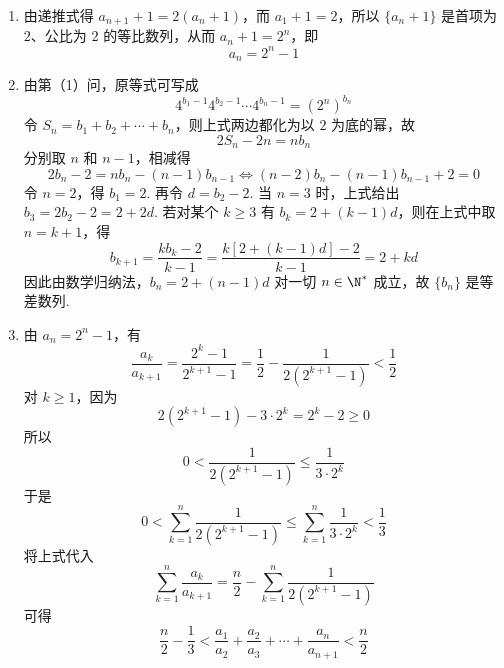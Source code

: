 \begin{solution}
\begin{enumerate}
\item 由递推式得 \(a_{n+1}+1=2(a_n+1)\)，而 \(a_1+1=2\)，所以 \(\{a_n+1\}\) 是首项为 \(2\)、公比为 \(2\) 的等比数列，从而 \(a_n+1=2^n\)，即
\[
a_n=2^n-1
\]
\item 由第（1）问，原等式可写成
\[
4^{b_1-1}4^{b_2-1}\cdots4^{b_n-1}=(2^n)^{b_n}
\]
令 \(S_n=b_1+b_2+\cdots+b_n\)，则上式两边都化为以 \(2\) 为底的幂，故
\[
2S_n-2n=nb_n
\]
分别取 \(n\) 和 \(n-1\)，相减得
\[
2b_n-2=nb_n-(n-1)b_{n-1}
\Longleftrightarrow
(n-2)b_n-(n-1)b_{n-1}+2=0
\]
令 \(n=2\)，得 \(b_1=2\). 再令 \(d=b_2-2\). 当 \(n=3\) 时，上式给出 \(b_3=2b_2-2=2+2d\). 若对某个 \(k\geqslant3\) 有 \(b_k=2+(k-1)d\)，则在上式中取 \(n=k+1\)，得
\[
b_{k+1}=\frac{kb_k-2}{k-1}=\frac{k\left[2+(k-1)d\right]-2}{k-1}=2+kd
\]
因此由数学归纳法，\(b_n=2+(n-1)d\) 对一切 \(n\in\N^*\) 成立，故 \(\{b_n\}\) 是等差数列.
\item 由 \(a_n=2^n-1\)，有
\[
\frac{a_k}{a_{k+1}}=\frac{2^k-1}{2^{k+1}-1}=\frac{1}{2}-\frac{1}{2(2^{k+1}-1)}<\frac{1}{2}
\]
对 \(k\geqslant1\)，因为
\[
2(2^{k+1}-1)-3\cdot2^k=2^k-2\geqslant0
\]
所以
\[
0<\frac{1}{2(2^{k+1}-1)}\leqslant\frac{1}{3\cdot2^k}
\]
于是
\[
0<\sum_{k=1}^{n}\frac{1}{2(2^{k+1}-1)}\leqslant\sum_{k=1}^{n}\frac{1}{3\cdot2^k}<\frac{1}{3}
\]
将上式代入
\[
\sum_{k=1}^{n}\frac{a_k}{a_{k+1}}=\frac{n}{2}-\sum_{k=1}^{n}\frac{1}{2(2^{k+1}-1)}
\]
可得
\[
\frac{n}{2}-\frac{1}{3}<\frac{a_1}{a_2}+\frac{a_2}{a_3}+\cdots+\frac{a_n}{a_{n+1}}<\frac{n}{2}
\]
\end{enumerate}
\end{solution}
